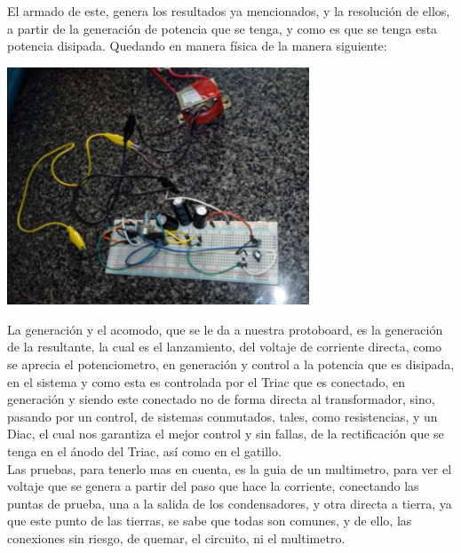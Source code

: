 \documentclass[12pt,letterpaper]{article}
\begin{document}
El armado de este, genera los resultados ya mencionados, y la resolución de ellos, a partir de la generación de potencia que se tenga, y como es que se tenga esta potencia disipada. Quedando en manera física de la manera siguiente:

\begin{center}
\includegraphics[width=9cm]{Fisico.jpeg} 
\end{center}

La generación y el acomodo, que se le da a nuestra protoboard, es la generación de la resultante, la cual es el lanzamiento, del voltaje de corriente directa, como se aprecia el potenciometro, en generación y control a la potencia que es disipada, en el sistema y como esta es controlada por el Triac que es conectado, en generación y siendo este conectado no de forma directa al transformador, sino, pasando por un control, de sistemas conmutados, tales, como resistencias, y un Diac, el cual nos garantiza el mejor control y sin fallas, de la rectificación que se tenga en el ánodo del Triac, así como en el gatillo.\\

Las pruebas, para tenerlo mas en cuenta, es la guia de un multimetro, para ver el voltaje que se genera a partir del paso que hace la corriente, conectando las puntas de prueba, una a la salida de los condensadores, y otra directa a tierra, ya que este punto de las tierras, se sabe que todas son comunes, y de ello, las conexiones sin riesgo, de quemar, el circuito, ni el multimetro.
\end{document}
